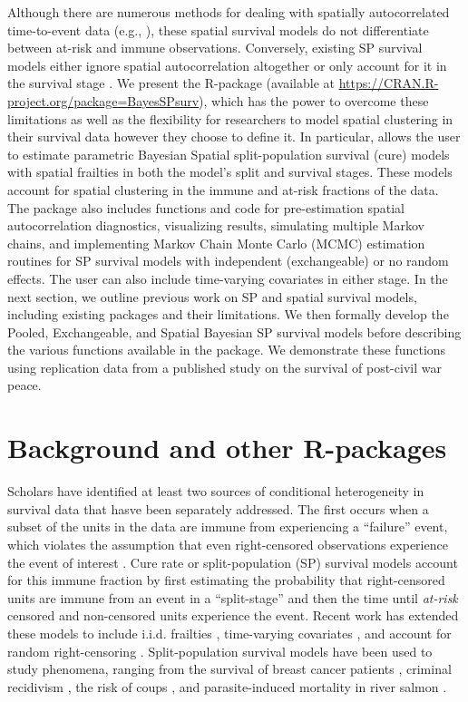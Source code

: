 Although there are numerous methods for dealing with spatially autocorrelated time-to-event data (e.g., \citealp{li2002modeling,banerjee2003frailty, henderson2002modeling, spBayesSurv-article}), these spatial survival models do not differentiate between at-risk and immune observations. Conversely, existing SP survival models either ignore spatial autocorrelation altogether or only account for it in the survival stage \citep{banerjee2004parametric}. We present the   \citep{BayesSPsurv} R-package (available at \url{https://CRAN.R-project.org/package=BayesSPsurv}), which has the power to overcome these limitations as well as the flexibility for researchers to model spatial clustering in their survival data however they choose to define it. In particular,  allows the user to estimate parametric Bayesian Spatial split-population survival (cure) models with spatial frailties in both the model's split and survival stages. These models account for spatial clustering in the immune and at-risk fractions of the data. The package also includes functions and code for pre-estimation spatial autocorrelation diagnostics, visualizing results, simulating multiple Markov chains, and implementing Markov Chain Monte Carlo (MCMC) estimation routines for SP survival models with independent (exchangeable) or no random effects. The user can also include time-varying covariates in either stage. In the next section, we outline previous work on SP and spatial survival models, including existing packages and their limitations. We then formally develop the Pooled, Exchangeable, and Spatial Bayesian SP survival models before describing the various functions available in the  package. We demonstrate these functions using replication data from a published study on the survival of post-civil war peace.

\section{Background and other R-packages}

Scholars have identified at least two sources of conditional heterogeneity in survival data that hasve been separately addressed. The first occurs when a subset of the units in the data are immune from experiencing a ``failure'' event, which violates the assumption that even right-censored observations experience the event of interest \citep{box1999modeling, boxsteffbook, beger2017splitting}. Cure rate or split-population (SP) survival models account for this immune fraction by first estimating the probability that right-censored units are immune from an event in a ``split-stage'' and then the time until \emph{at-risk} censored and non-censored units experience the event. Recent work has extended these models to include i.i.d. frailties \citep{peng2011mixture}, time-varying covariates \citep{beger2017splitting}, and account for random right-censoring \citep{patilea2020general}. Split-population survival models have been used to study phenomena, ranging from the survival of breast cancer patients \citep{wang2005gene}, criminal recidivism \citep{schmidt1989predicting}, the risk of coups \citep{beger2017splitting}, and parasite-induced mortality in river salmon \citep{ray2014using}. 

